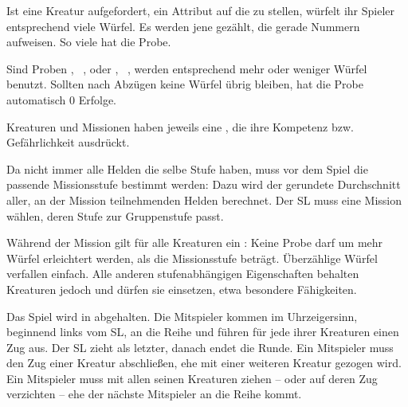 {		Ist eine Kreatur aufgefordert, ein Attribut auf die  zu stellen, würfelt ihr Spieler entsprechend viele Würfel. Es werden jene gezählt, die gerade Nummern aufweisen. So viele  hat die Probe.


		\noindent
		Sind Proben , \zB~, oder , \zB~, werden entsprechend mehr oder weniger Würfel benutzt. Sollten nach Abzügen keine Würfel übrig bleiben, hat die Probe automatisch 0 Erfolge.


		Kreaturen und Missionen haben jeweils eine , die ihre Kompetenz bzw. Gefährlichkeit ausdrückt.

		Da nicht immer alle Helden die selbe Stufe haben, muss vor dem Spiel die passende Missionsstufe bestimmt werden: Dazu wird der gerundete Durchschnitt aller, an der Mission teilnehmenden Helden berechnet. Der SL muss eine Mission wählen, deren Stufe zur Gruppenstufe passt.


		\noindent
		Während der Mission gilt für alle Kreaturen ein : Keine Probe darf um mehr Würfel erleichtert werden, als die Missionsstufe beträgt. Überzählige Würfel verfallen einfach. Alle anderen stufenabhängigen Eigenschaften behalten Kreaturen jedoch und dürfen sie einsetzen, etwa besondere Fähigkeiten.


		Das Spiel wird in  abgehalten. Die Mitspieler kommen im Uhrzeigersinn, beginnend links vom SL, an die Reihe und führen für jede ihrer Kreaturen einen Zug aus. Der SL zieht als letzter, danach endet die Runde. Ein Mitspieler muss den Zug einer Kreatur abschließen, ehe mit einer weiteren Kreatur gezogen wird. Ein Mitspieler muss mit allen seinen Kreaturen ziehen -- oder auf deren Zug verzichten -- ehe der nächste Mitspieler an die Reihe kommt.

}
